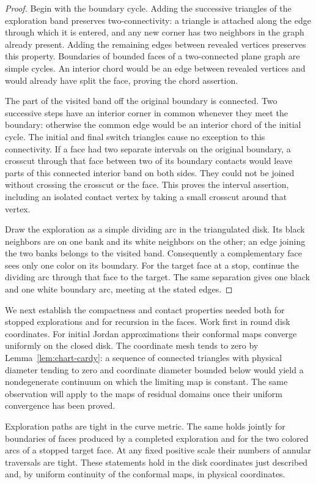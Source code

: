 \begin{proof}
Begin with the boundary cycle.  Adding the successive triangles of the
exploration band preserves two-connectivity: a triangle is attached
along the edge through which it is entered, and any new corner has two
neighbors in the graph already present.  Adding the remaining edges
between revealed vertices preserves this property.  Boundaries of
bounded faces of a two-connected plane graph are simple cycles.  An
interior chord would be an edge between revealed vertices and would
already have split the face, proving the chord assertion.

The part of the visited band off the original boundary is connected.
Two successive steps have an interior corner in common whenever they
meet the boundary: otherwise the common edge would be an interior chord
of the initial cycle.  The initial and final switch triangles cause no
exception to this connectivity.  If a face had two separate intervals
on the original boundary, a crosscut through that face between two of
its boundary contacts would leave parts of this connected interior band
on both sides.  They could not be joined without crossing the crosscut
or the face.  This proves the interval assertion, including an isolated
contact vertex by taking a small crosscut around that vertex.

Draw the exploration as a simple dividing arc in the triangulated disk.
Its black neighbors are on one bank and its white neighbors on the
other; an edge joining the two banks belongs to the visited band.
Consequently a complementary face sees only one color on its boundary.
For the target face at a stop, continue the dividing arc through that
face to the target.  The same separation gives one black and one white
boundary arc, meeting at the stated edges.
\end{proof}

We next establish the compactness and contact properties needed both
for stopped explorations and for recursion in the faces.  Work first in
round disk coordinates.  For initial Jordan approximations their
conformal maps converge uniformly on the closed disk.  The coordinate
mesh tends to zero by Lemma~\ref{lem:chart-cardy}: a sequence of
connected triangles with physical diameter tending to zero and
coordinate diameter bounded below would yield a nondegenerate
continuum on which the limiting map is constant.  The same observation
will apply to the maps of residual domains once their uniform
convergence has been proved.

\begin{lemma}
\label{lem:exploration-tightness}
Exploration paths are tight in the curve metric.  The same holds jointly
for boundaries of faces produced by a completed exploration and for
the two colored arcs of a stopped target face.  At any fixed positive
scale their numbers of annular traversals are tight.  These statements
hold in the disk coordinates just described and, by uniform continuity
of the conformal maps, in physical coordinates.
\end{lemma}

